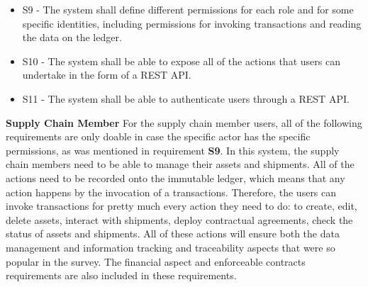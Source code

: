 \begin{itemize}
			\item S9 - The system shall define different permissions for each role and for some specific identities, including permissions for invoking transactions and reading the data on the ledger.
			\item S10 - The system shall be able to expose all of the actions that users can undertake in the form of a REST API.
			\item S11 - The system shall be able to authenticate users through a REST API.
			
		\end{itemize}
        
		\par \textbf{Supply Chain Member}
        For the supply chain member users, all of the following requirements are only doable in case the specific actor has the specific permissions, as was mentioned in requirement \textbf{S9}. In this system, the supply chain members need to be able to manage their assets and shipments. All of the actions need to be recorded onto the immutable ledger, which means that any action happens by the invocation of a transactions. Therefore, the users can invoke transactions for pretty much every action they need to do: to create, edit, delete assets, interact with shipments, deploy contractual agreements, check the status of assets and shipments. All of these actions will ensure both the data management and information tracking and traceability aspects that were so popular in the survey. The financial aspect and enforceable contracts requirements are also included in these requirements.
        
